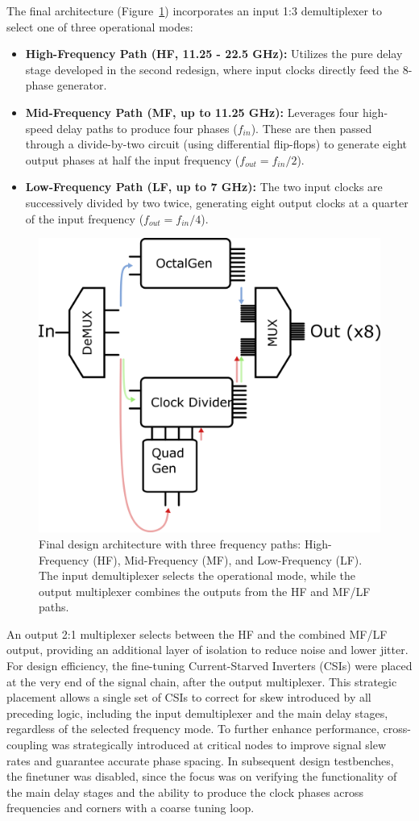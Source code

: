 The final architecture (Figure~\ref{fig:mixF_design}) incorporates an input 1:3 demultiplexer to select one of three operational modes:
\begin{itemize}
    \item \textbf{High-Frequency Path (HF, 11.25 - 22.5 GHz):} Utilizes the pure delay stage developed in the second redesign, where input clocks directly feed the 8-phase generator.
    \item \textbf{Mid-Frequency Path (MF, up to 11.25 GHz):} Leverages four high-speed delay paths to produce four phases ($f_{in}$). These are then passed through a divide-by-two circuit (using differential flip-flops) to generate eight output phases at half the input frequency ($f_{out} = f_{in}/2$).
    \item \textbf{Low-Frequency Path (LF, up to 7 GHz):} The two input clocks are successively divided by two twice, generating eight output clocks at a quarter of the input frequency ($f_{out} = f_{in}/4$).
\end{itemize}
\begin{figure}[htbp]
  \centering
  \includegraphics[width=0.5\linewidth]{figures/Schematics/mixF_design.png}
  \caption{Final design architecture with three frequency paths: High-Frequency (HF), Mid-Frequency (MF), and Low-Frequency (LF). The input demultiplexer selects the operational mode, while the output multiplexer combines the outputs from the HF and MF/LF paths.}
  \label{fig:mixF_design}
\end{figure}
An output 2:1 multiplexer selects between the HF and the combined MF/LF output, providing an additional layer of isolation to reduce noise and lower jitter. For design efficiency, the fine-tuning Current-Starved Inverters (CSIs) were placed at the very end of the signal chain, after the output multiplexer. This strategic placement allows a single set of CSIs to correct for skew introduced by all preceding logic, including the input demultiplexer and the main delay stages, regardless of the selected frequency mode.
To further enhance performance, cross-coupling was strategically introduced at critical nodes to improve signal slew rates and guarantee accurate phase spacing.
In subsequent design testbenches, the finetuner was disabled, since the focus was on verifying the functionality of the main delay stages and the ability to produce the clock phases across frequencies and corners with a coarse tuning loop.
